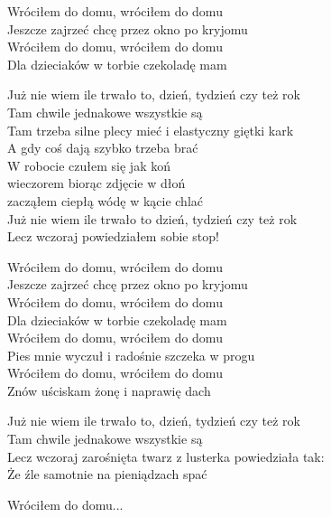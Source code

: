 \begin{text}
    \vin Wróciłem do domu, wróciłem do domu\\
    \vin Jeszcze zajrzeć chcę przez okno po kryjomu\\
    \vin Wróciłem do domu, wróciłem do domu\\
    \vin Dla dzieciaków w torbie czekoladę mam

    Już nie wiem ile trwało to, dzień, tydzień czy też rok\\
    Tam chwile jednakowe wszystkie są\\
    Tam trzeba silne plecy mieć i elastyczny giętki kark\\
    A gdy coś dają szybko trzeba brać\\
    W robocie czułem się jak koń\\
	wieczorem biorąc zdjęcie w dłoń\\
    zacząłem ciepłą wódę w kącie chlać\\
    Już nie wiem ile trwało to dzień, tydzień czy też rok\\
    Lecz wczoraj powiedziałem sobie stop!

    \vin Wróciłem do domu, wróciłem do domu\\
    \vin Jeszcze zajrzeć chcę przez okno po kryjomu\\
    \vin Wróciłem do domu, wróciłem do domu\\
    \vin Dla dzieciaków w torbie czekoladę mam\\
    \vin Wróciłem do domu, wróciłem do domu\\
    \vin Pies mnie wyczuł i radośnie szczeka w progu\\
    \vin Wróciłem do domu, wróciłem do domu\\
    \vin Znów uściskam żonę i naprawię dach

    Już nie wiem ile trwało to, dzień, tydzień czy też rok\\
    Tam chwile jednakowe wszystkie są\\
    Lecz wczoraj zarośnięta twarz z lusterka powiedziała tak:\\
    Że źle samotnie na pieniądzach spać
	
	\vin Wróciłem do domu...
\end{text}
